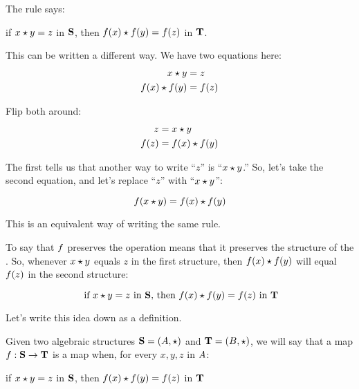 \documentclass[../../../main.tex]{subfiles}
\begin{document}
\begin{aside}
  \begin{remark}
    The rule says:
    
    \begin{center}
      if $\op{x}{y} = z$ in $\mathbf{S}$, then $\op{\func{f}(x)}{\func{f}(y)} = \func{f}(z)$ in $\mathbf{T}$.
    \end{center}
    
    This can be written a different way. We have two equations here:
    \begin{align*}
      \op{x}{y} &= z \\
      \op{\func{f}(x)}{\func{f}(y)} &= \func{f}(z)
    \end{align*}
    
    Flip both around:
    \begin{align*}
      z &= \op{x}{y} \\
      \func{f}(z) &= \op{\func{f}(x)}{\func{f}(y)}
    \end{align*}
    
    The first tells us that another way to write ``$z$'' is ``$\op{x}{y}$.'' So, let's take the second equation, and let's replace ``$z$'' with ``$\op{x}{y}$'':
    
    \begin{equation*}
      \func{f}(\op{x}{y}) = \op{\func{f}(x)}{\func{f}(y)}
    \end{equation*}
    
    This is an equivalent way of writing the same rule.
  \end{remark}
\end{aside}

To say that $f$ preserves the operation means that it preserves the structure of the . So, whenever $\op{x}{y}$ equals $z$ in the first structure, then $\op{\func{f}(x)}{\func{f}(y)}$ will equal $f(z)$ in the second structure:

\begin{equation*}
  \text{ if } \op{x}{y} = z \text{ in $\algebra{S}$, then } \op{\func{f}(x)}{\func{f}(y)} = \func{f}(z) \text{ in $\algebra{T}$}
\end{equation*}

Let's write this idea down as a definition.

\begin{fdefinition}
  \label{def:algebra-structure-preserving-maps}
  Given two algebraic structures $\algebra{S} = (\set{A}, \opSymbol/)$ and $\algebra{T} = (\set{B}, \opSymbol/)$, we will say that a map $f: \mathbf{S} \rightarrow \mathbf{T}$ is a  map when, for every $x, y, z$ in $A$: 
  
  \begin{center}
    if $\op{x}{y} = z$ in $\mathbf{S}$, then $\op{\func{f}(x)}{\func{f}(y)} = \func{f}(z)$ in $\mathbf{T}$
  \end{center}
\end{fdefinition}
\end{document}
